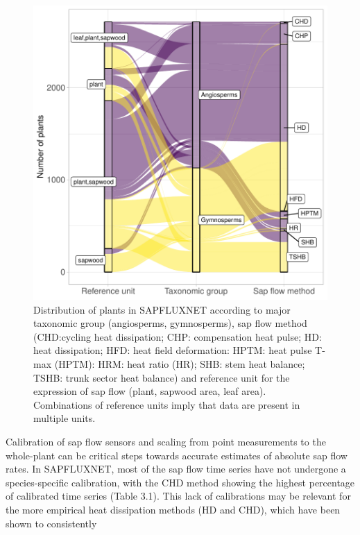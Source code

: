 \documentclass[11pt,twoside]{reedthesis}
\begin{document}
\setlength{\abovecaptionskip}{0pt}
\begin{figure}[hbt!]

{\centering \includegraphics[width=1\linewidth]{figure/CH3/Figure4} 

}

\caption[Distribution of plants according to major taxonomic group and sap flow method.]{Distribution of plants in SAPFLUXNET according to major taxonomic group (angiosperms, gymnosperms), sap flow method (CHD:cycling heat dissipation; CHP: compensation heat pulse; HD: heat dissipation; HFD: heat field deformation: HPTM: heat pulse T-max (HPTM): HRM: heat ratio (HR); SHB: stem heat balance; TSHB: trunk sector heat balance) and reference unit for the expression of sap flow (plant, sapwood area, leaf area). Combinations of reference units imply that data are present in multiple units.}\label{fig:Ch2plot4}
\end{figure}
Calibration of sap flow sensors and scaling from point measurements to
the whole-plant can be critical steps towards accurate estimates of
absolute sap flow rates. In SAPFLUXNET, most of the sap flow time series
have not undergone a species-specific calibration, with the CHD method
showing the highest percentage of calibrated time series (Table 3.1).
This lack of calibrations may be relevant for the more empirical heat
dissipation methods (HD and CHD), which have been shown to consistently
\end{document}
